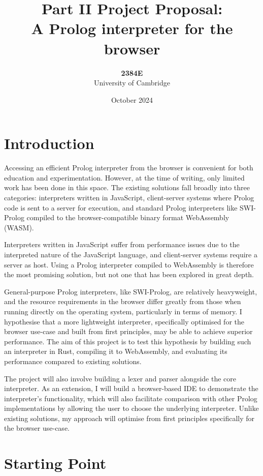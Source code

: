 \documentclass{article}
\title{Part II Project Proposal:\\
{\bf A Prolog interpreter for the browser}}
\author{\textbf{2384E} \\
University of Cambridge}
\date{October 2024}
\begin{document}
\maketitle

\section*{Introduction}

Accessing an efficient Prolog interpreter from the browser is convenient for both education and experimentation. However, at the time of writing, only limited work has been done in this space. The existing solutions fall broadly into three categories: interpreters written in JavaScript, client-server systems where Prolog code is sent to a server for execution, and standard Prolog interpreters like SWI-Prolog \cite{swiprolog} compiled to the browser-compatible binary format WebAssembly (WASM).

Interpreters written in JavaScript suffer from performance issues due to the interpreted nature of the JavaScript language, and client-server systems require a server as host. Using a Prolog interpreter compiled to WebAssembly is therefore the most promising solution, but not one that has been explored in great depth.

General-purpose Prolog interpreters, like SWI-Prolog, are relatively heavyweight, and the resource requirements in the browser differ greatly from those when running directly on the operating system, particularly in terms of memory. I hypothesise that a more lightweight interpreter, specifically optimised for the browser use-case and built from first principles, may be able to achieve superior performance. The aim of this project is to test this hypothesis by building such an interpreter in Rust, compiling it to WebAssembly, and evaluating its performance compared to existing solutions.

The project will also involve building a lexer and parser alongside the core interpreter. As an extension, I will build a browser-based IDE to demonstrate the interpreter’s functionality, which will also facilitate comparison with other Prolog implementations by allowing the user to choose the underlying interpreter. Unlike existing solutions, my approach will optimise from first principles specifically for the browser use-case.

\section*{Starting Point}
\end{document}
